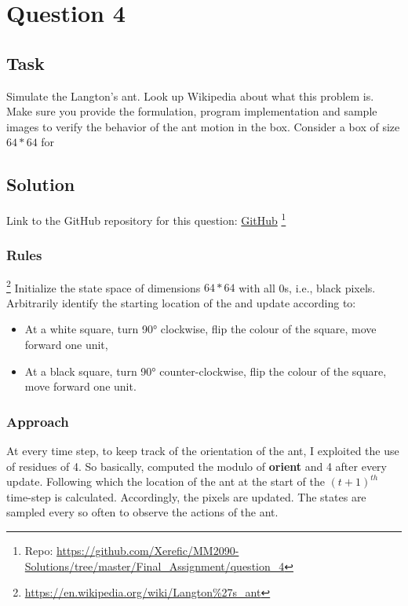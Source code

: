 \section{Question 4}

\subsection{Task}
Simulate the Langton’s ant. Look up Wikipedia about what this problem is. Make sure you provide the formulation, program implementation and sample images to verify the behavior of the ant motion in the box. Consider a box of size $64*64$ for


\subsection{Solution}

Link to the GitHub repository for this question: \href{https://github.com/Xerefic/MM2090-Solutions/tree/master/Final_Assignment/question_4}{GitHub} \footnote{Repo: \url{https://github.com/Xerefic/MM2090-Solutions/tree/master/Final_Assignment/question_4}}

\subsubsection{Rules}\footnote{\url{https://en.wikipedia.org/wiki/Langton\%27s_ant}}
Initialize the state space of dimensions $64*64$ with all 0s, i.e., black pixels. Arbitrarily identify the starting location of the and update according to:
\begin{itemize}
	\item At a white square, turn 90° clockwise, flip the colour of the square, move forward one unit,
	\item At a black square, turn 90° counter-clockwise, flip the colour of the square, move forward one unit.
\end{itemize}

\subsubsection{Approach}
At every time step, to keep track of the orientation of the ant, I exploited the use of residues of 4. So basically, computed the modulo of \textbf{orient} and 4 after every update. Following which the location of the ant at the start of the $\left(t+1\right)^{th}$ time-step is calculated. Accordingly, the pixels are updated. The states are sampled every so often to observe the actions of the ant.


